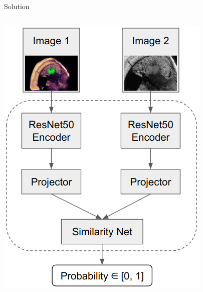 \documentclass{beamer}
\begin{document}
\begin{frame}{Solution}
\begin{columns}
    \begin{center}
        \includegraphics[width=1\textwidth]{fig/model.png}
    \end{center}
\end{columns}
\end{frame}

\end{document}
